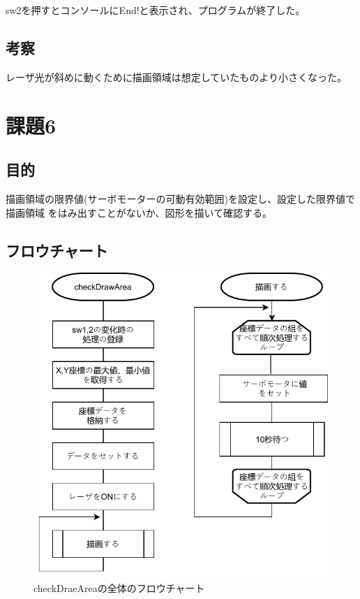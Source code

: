 \documentclass{jarticle}
\begin{document}
sw2を押すとコンソールにEnd!と表示され、プログラムが終了した。
\subsection{考察}

レーザ光が斜めに動くために描画領域は想定していたものより小さくなった。

\section{課題6}

\subsection{目的}
 描画領域の限界値(サーボモーターの可動有効範囲)を設定し、設定した限界値で描画領域 をはみ出すことがないか、図形を描いて確認する。


\subsection{フロウチャート}

\begin{figure}[H]
    \centering
    \includegraphics{kumikomi6-checkDrawArea.pdf}
    \caption{checkDraeAreaの全体のフロウチャート}
    \label{fig:my_label}
\end{figure}
\end{document}

